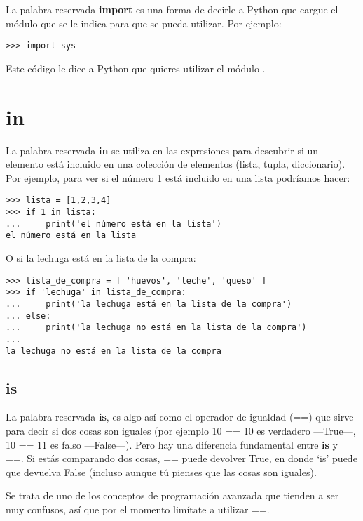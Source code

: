 \begin{listing}
La palabra reservada \textbf{import} es una forma de decirle a Python que cargue el módulo que se le indica para que se pueda utilizar. Por ejemplo:

\begin{listing}
\begin{verbatim}
>>> import sys
\end{verbatim}
\end{listing}

Este código le dice a Python que quieres utilizar el módulo .

\section*{in}

La palabra reservada \textbf{in} se utiliza en las expresiones para descubrir si un elemento está incluido en una colección de elementos (lista, tupla, diccionario). Por ejemplo, para ver si el número 1 está incluido en una lista podríamos hacer:

\begin{listing}
\begin{verbatim}
>>> lista = [1,2,3,4]
>>> if 1 in lista:
...     print('el número está en la lista')
el número está en la lista
\end{verbatim}
\end{listing}

\noindent
O si la lechuga está en la lista de la compra:

\begin{listing}
\begin{verbatim}
>>> lista_de_compra = [ 'huevos', 'leche', 'queso' ]
>>> if 'lechuga' in lista_de_compra:
...     print('la lechuga está en la lista de la compra')
... else:
...     print('la lechuga no está en la lista de la compra')
...
la lechuga no está en la lista de la compra
\end{verbatim}
\end{listing}

\subsection*{is}

La palabra reservada \textbf{is}, es algo así como el operador de igualdad (==) que sirve para decir si dos cosas son iguales (por ejemplo 10 == 10 es verdadero ---True---, 10 == 11 es falso ---False---).  Pero hay una diferencia fundamental entre \textbf{is} y ==. Si estás comparando dos cosas, == puede devolver True, en donde `is' puede que devuelva False (incluso aunque tú pienses que las cosas son iguales).
\par
Se trata de uno de los conceptos de programación avanzada que tienden a ser muy confusos, así que por el momento limítate a utilizar ==.


\end{listing}

